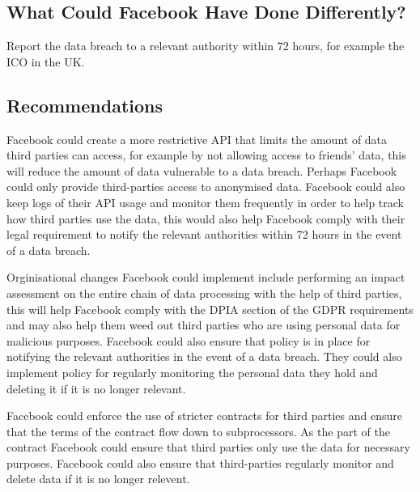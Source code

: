 \documentclass[a4wide, 11pt]{article}
\begin{document}
\subsection{What Could Facebook Have Done Differently?}

Report the data breach to a relevant authority within 72 hours, for example the ICO in the UK.

\subsection{Recommendations}

Facebook could create a more restrictive API that limits the amount of data third parties can access, for example by not allowing access to friends' data, this will reduce the amount of data vulnerable to a data breach. Perhaps Facebook could only provide third-parties access to anonymised data. Facebook could also keep logs of their API usage and monitor them frequently in order to help track how third parties use the data, this would also help Facebook comply with their legal requirement to notify the relevant authorities within 72 hours in the event of a data breach.

Orginisational changes Facebook could implement include performing an impact assessment on the entire chain of data processing with the help of third parties, this will help Facebook comply with the DPIA section of the GDPR requirements and may also help them weed out third parties who are using personal data for malicious purposes. Facebook could also ensure that policy is in place for notifying the relevant authorities in the event of a data breach. They could also implement policy for regularly monitoring the personal data they hold and deleting it if it is no longer relevant.

Facebook could enforce the use of stricter contracts for third parties and ensure that the terms of the contract flow down to subprocessors. As the part of the contract Facebook could ensure that third parties only use the data for necessary purposes. Facebook could also ensure that third-parties regularly monitor and delete data if it is no longer relevent.
\end{document}
